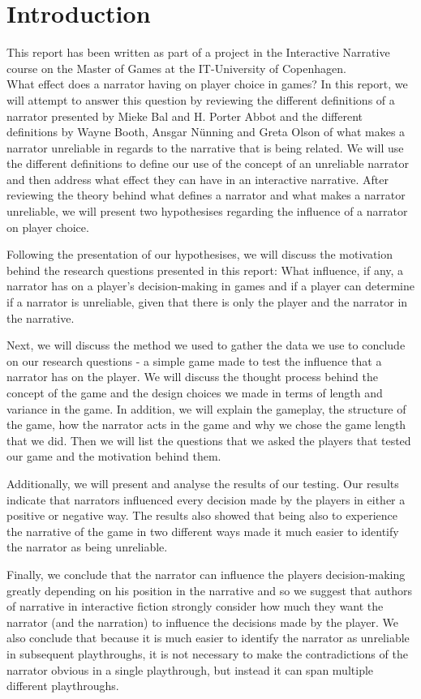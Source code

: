 \section{Introduction}
\label{Introduction}

This report has been written as part of a project in the Interactive Narrative course on the Master of Games at the IT-University of Copenhagen.\\

What effect does a narrator having on player choice in games? In this report, we will attempt to answer this question by reviewing the different definitions of a narrator presented by Mieke Bal and H. Porter Abbot and the different definitions by Wayne Booth, Ansgar N\"unning and Greta Olson of what makes a narrator unreliable in regards to the narrative that is being related. We will use the different definitions to define our use of the concept of an unreliable narrator and then address what effect they can have in an interactive narrative. After reviewing the theory behind what defines a narrator and what makes a narrator unreliable, we will present two hypothesises regarding the influence of a narrator on player choice.

Following the presentation of our hypothesises, we will discuss the motivation behind the research questions presented in this report: What influence, if any, a narrator has on a player's decision-making in games and if a player can determine if a narrator is unreliable, given that there is only the player and the narrator in the narrative. 

Next, we will discuss the method we used to gather the data we use to conclude on our research questions - a simple game made to test the influence that a narrator has on the player. We will discuss the thought process behind the concept of the game and the design choices we made in terms of length and variance in the game. In addition, we will explain the gameplay, the structure of the game, how the narrator acts in the game and why we chose the game length that we did. Then we will list the questions that we asked the players that tested our game and the motivation behind them.

Additionally, we will present and analyse the results of our testing. Our results indicate that narrators influenced every decision made by the players in either a positive or negative way. The results also showed that being also to experience the narrative of the game in two different ways made it much easier to identify the narrator as being unreliable.

Finally, we conclude that the narrator can influence the players decision-making greatly depending on his position in the narrative and so we suggest that authors of narrative in interactive fiction strongly consider how much they want the narrator (and the narration) to influence the decisions made by the player. We also conclude that because it is much easier to identify the narrator as unreliable in subsequent playthroughs, it is not necessary to make the contradictions of the narrator obvious in a single playthrough, but instead it can span multiple different playthroughs.